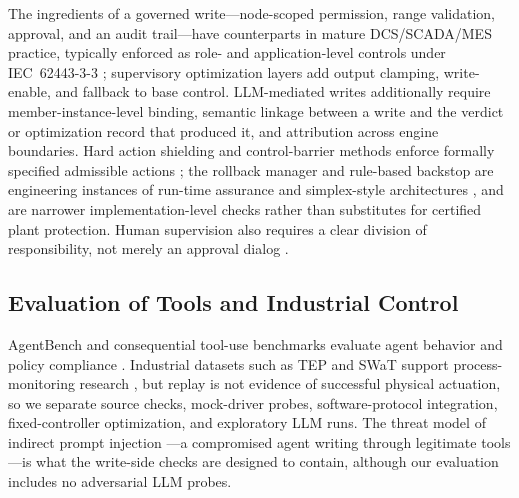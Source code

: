 The ingredients of a governed write---node-scoped permission, range validation,
approval, and an audit trail---have counterparts in mature DCS/SCADA/MES practice,
typically enforced as role- and application-level controls under IEC~62443-3-3
\cite{iec62443-3-3}; supervisory optimization layers add output clamping,
write-enable, and fallback to base control. LLM-mediated writes additionally require
member-instance-level binding, semantic linkage between a write and the verdict or
optimization record that produced it, and attribution across engine boundaries. Hard action shielding
and control-barrier methods enforce formally specified admissible actions
\cite{alshiekh2018shielding}; the rollback manager and rule-based backstop are
engineering instances of run-time assurance and simplex-style architectures
\cite{sha2001simplex}, and are narrower implementation-level checks rather than
substitutes for certified plant protection. Human supervision also requires a clear
division of responsibility, not merely an approval dialog
\cite{parasuraman2000model,bainbridge1983ironies}.

\subsection{Evaluation of Tools and Industrial Control}
AgentBench and consequential tool-use benchmarks evaluate agent behavior and policy
compliance \cite{liu2024agentbench,yao2024taubench}. Industrial datasets such as TEP
and SWaT support process-monitoring research \cite{downs1993tep,goh2017swat}, but
replay is not evidence of successful physical actuation, so we separate source
checks, mock-driver probes, software-protocol integration, fixed-controller
optimization, and exploratory LLM runs. The threat model of
indirect prompt injection \cite{greshake2023injection}---a compromised agent writing
through legitimate tools---is what the write-side checks are designed to contain,
although our evaluation includes no adversarial LLM probes.
